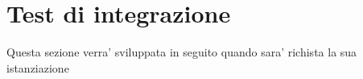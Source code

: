 \section{Test di integrazione}
Questa sezione verra' sviluppata in seguito quando sara' richista la sua istanziazione